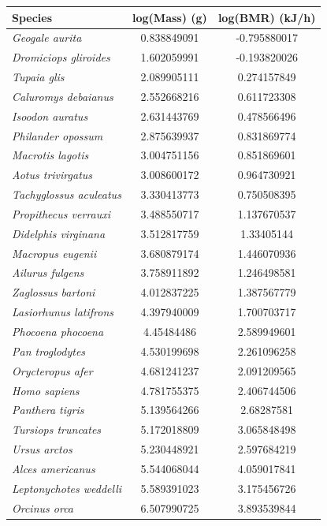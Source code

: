 \documentclass[10pt,letterpaper]{article}
\begin{document}
			\begin{center}
				\begin{tabular}{l c c}
					Species & log(Mass) (g) & log(BMR) (kJ/h) \\
					\hline
					\emph{Geogale aurita} & 0.838849091 & -0.795880017 \\
					\emph{Dromiciops gliroides} & 1.602059991 & -0.193820026 \\
					\emph{Tupaia glis} & 2.089905111 & 0.274157849 \\
					\emph{Caluromys debaianus} & 2.552668216 & 0.611723308 \\
					\emph{Isoodon auratus} & 2.631443769 & 0.478566496 \\
					\emph{Philander opossum} & 2.875639937 & 0.831869774 \\
					\emph{Macrotis lagotis} & 3.004751156 & 0.851869601 \\
					\emph{Aotus trivirgatus} & 3.008600172 & 0.964730921 \\
					\emph{Tachyglossus aculeatus} & 3.330413773 & 0.750508395 \\
					\emph{Propithecus verrauxi} & 3.488550717 & 1.137670537 \\
					\emph{Didelphis virginana}  & 3.512817759 & 1.33405144 \\
					\emph{Macropus eugenii} & 3.680879174 & 1.446070936 \\
					\emph{Ailurus fulgens} & 3.758911892 & 1.246498581 \\
					\emph{Zaglossus bartoni} & 4.012837225 & 1.387567779 \\
					\emph{Lasiorhunus latifrons} & 4.397940009 & 1.700703717 \\
					\emph{Phocoena phocoena} & 4.45484486 & 2.589949601 \\
					\emph{Pan troglodytes} & 4.530199698 & 2.261096258 \\
					\emph{Orycteropus afer} & 4.681241237 & 2.091209565 \\
					\emph{Homo sapiens} & 4.781755375 & 2.406744506 \\
					\emph{Panthera tigris} & 5.139564266 & 2.68287581 \\
					\emph{Tursiops truncates} & 5.172018809 & 3.065848498 \\
					\emph{Ursus arctos} & 5.230448921 & 2.597684219 \\
					\emph{Alces americanus} & 5.544068044 & 4.059017841 \\
					\emph{Leptonychotes weddelli} & 5.589391023 & 3.175456726 \\
					\emph{Orcinus orca} & 6.507990725 & 3.893539844 
				\end{tabular}
			\end{center}
\end{document}
